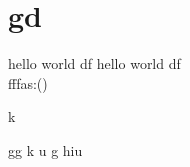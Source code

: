 \documentclass{article}
\begin{document}
\section{gd}
	hello world df \textbf{\gitRel}
	hello world df \textbf{\gitRel}\\
	fffas:\gitRoff(\gitCommitterDate)\\
	\newpage
	\begin{changelog}[author=Michele]
		\begin{version}[version=1.20]
			\added
			\item k
		\end{version}
		\begin{version}[version=\gitReln]
		\added
		\item gg k u g  hiu 
	\end{version}
	\end{changelog}
\end{document}
